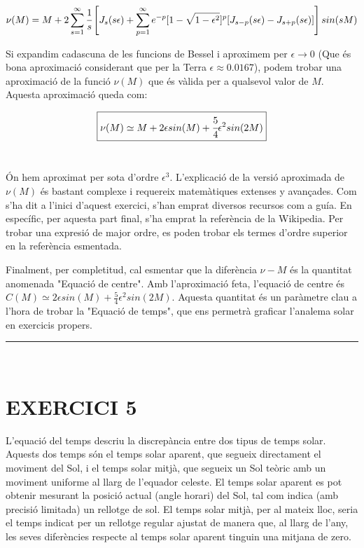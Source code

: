 \documentclass[a4paper, 11pt]{article}
\begin{document}
\begin{equation*}
    \nu(M) = M + 2\sum_{s=1}^{\infty} \cfrac{1}{s} \left[ J_s(s\epsilon) + \sum_{p=1}^{\infty} e^{-p}[1-\sqrt{1-\epsilon^2}]^p[J_{s-p}(s\epsilon) - J_{s+p}(s\epsilon)] \right] sin(sM)
\end{equation*}
\vspace{2mm}

\noindent Si expandim cadascuna de les funcions de Bessel i aproximem per $\epsilon \to 0$ (Que és bona aproximació considerant que per la Terra $\epsilon \approx 0.0167$), podem trobar una aproximació de la funció $\nu(M)$ que és vàlida per a qualsevol valor de $M$. Aquesta aproximació queda com:

\vspace{2mm}
\begin{equation} \label{aproximacio_Mnu}
    \boxed{  \nu(M) \simeq M + 2\epsilon sin(M) + \cfrac{5}{4} \epsilon ^2 sin(2M)  }
\end{equation}\
\vspace{2mm}

\noindent Ón hem aproximat per sota d'ordre $\epsilon^3$. L'explicació de la versió aproximada de $\nu(M)$ és bastant complexe i requereix matemàtiques extenses y avançades. Com s'ha dit a l'inici d'aquest exercici, s'han emprat diversos recursos com a guía. En específic, per aquesta part final, s'ha emprat la referència \cite{EQ_OF_CENTER} de la Wikipedia. Per trobar una expresió de major ordre, es poden trobar els termes d'ordre superior en la referència esmentada.

\vspace{2mm}

\noindent Finalment, per completitud, cal esmentar que la diferència $\nu - M$ és la quantitat anomenada "Equació de centre". Amb l'aproximació feta, l'equació de centre és  $C(M) \simeq 2\epsilon sin(M) + \frac{5}{4} \epsilon ^2 sin(2M)$. Aquesta quantitat és un paràmetre clau a l'hora de trobar la "Equació de temps", que ens permetrà graficar l'analema solar en exercicis propers.

\vspace{10mm}
\hrule\
\vspace{5mm}


\section*{EXERCICI 5}
\noindent L’equació del temps descriu la discrepància entre dos tipus de temps solar. Aquests dos temps són el temps solar aparent, que segueix directament el moviment del Sol, i el temps solar mitjà, que segueix un Sol teòric amb un moviment uniforme al llarg de l’equador celeste. El temps solar aparent es pot obtenir mesurant la posició actual (angle horari) del Sol, tal com indica (amb precisió limitada) un rellotge de sol. El temps solar mitjà, per al mateix lloc, seria el temps indicat per un rellotge regular ajustat de manera que, al llarg de l’any, les seves diferències respecte al temps solar aparent tinguin una mitjana de zero.
\end{document}
